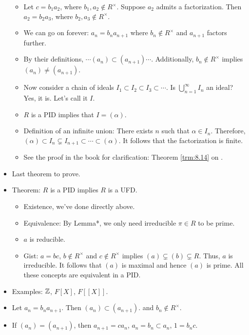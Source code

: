 \documentclass[../notes.tex]{subfiles}
\begin{document}
\begin{itemize}
\begin{itemize}
        \item Let $c=b_1a_2$, where $b_1,a_2\notin R^\times$. Suppose $a_2$ admits a factorization. Then $a_2=b_2a_3$, where $b_2,a_3\notin R^\times$.
        \item We can go on forever: $a_n=b_na_{n+1}$ where $b_n\notin R^\times$ and $a_{n+1}$ factors further.
        \item By their definitions, $\cdots(a_n)\subset(a_{n+1})\cdots$. Additionally, $b_n\notin R^\times$ implies $(a_n)\neq(a_{n+1})$.
        \item Now consider a chain of ideals $I_1\subset I_2\subset I_3\subset\cdots$. Is $\bigcup_{n=1}^\infty I_n$ an ideal? Yes, it is. Let's call it $I$.
        \item $R$ is a PID implies that $I=(\alpha)$.
        \item Definition of an infinite union: There exists $n$ such that $\alpha\in I_n$. Therefore, $(\alpha)\subset I_n\subsetneq I_{n+1}\subset\cdots\subset(\alpha)$. It follows that the factorization is finite.
        \item See the proof in the book for clarification: Theorem \ref{trm:8.14} on \textcite[287-89]{bib:DummitFoote}.
    \end{itemize}
    \item Last theorem to prove.
    \item Theorem: $R$ is a PID implies $R$ is a UFD.
    \begin{itemize}
        \item Existence, we've done directly above.
        \item Equivalence: By Lemma*, we only need irreducible $\pi\in R$ to be prime.
        \item $a$ is reducible.
        \item Gist: $a=bc$, $b\notin R^\times$ and $c\notin R^\times$ implies $(a)\subsetneq(b)\subsetneq R$. Thus, $a$ is irreducible. It follows that $(a)$ is maximal and hence $(a)$ is prime. All these concepts are equivalent in a PID.
    \end{itemize}
    \item Examples: $\mathbb{Z}$, $F[X]$, $F[[X]]$.
    \item Let $a_n=b_na_{n+1}$. Then $(a_n)\subset(a_{n+1})$. and $b_n\notin R^\times$.
    \item If $(a_n)=(a_{n+1})$, then $a_{n+1}=ca_n$, $a_n=b_n\subset a_n$, $1=b_nc$.
\end{itemize}
\end{document}
